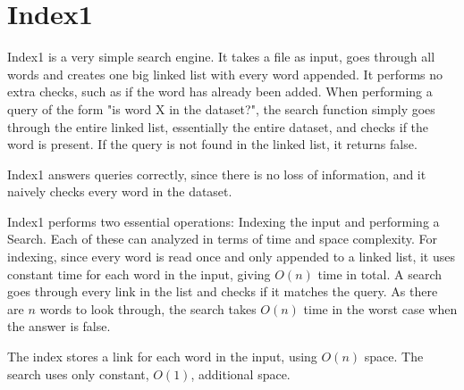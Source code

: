 \section{Index1}

Index1 is a very simple search engine. It takes a file as input, goes through all words and creates one big linked list with every word appended. It performs no extra checks, such as if the word has already been added. When performing a query of the form "is word X in the dataset?", the search function simply goes through the entire linked list, essentially the entire dataset, and checks if the word is present. If the query is not found in the linked list, it returns false. 

Index1 answers queries correctly, since there is no loss of information, and it naively checks every word in the dataset. 

Index1 performs two essential operations: Indexing the input and performing a Search. Each of these can analyzed in terms of time and space complexity. For indexing, since every word is read once and only appended to a linked list, it uses constant time for each word in the input, giving $O(n)$ time in total. A search goes through every link in the list and checks if it matches the query. As there are $n$ words to look through, the search takes $O(n)$ time in the worst case when the answer is false. 

The index stores a link for each word in the input, using $O(n)$ space. The search uses only constant, $O(1)$, additional space. 
